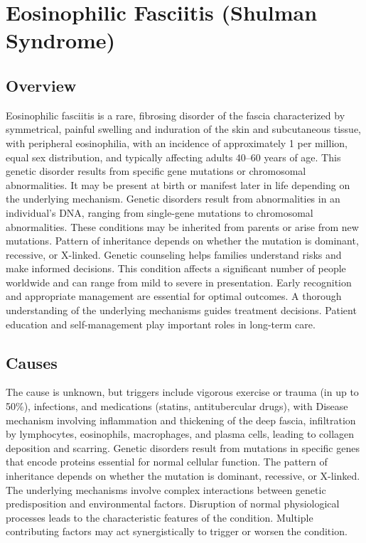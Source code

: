 \chapter{Eosinophilic Fasciitis (Shulman Syndrome)}
\label{sec:Eosinophilic Fasciitis (Shulman Syndrome)}

\section{Overview}
Eosinophilic fasciitis is a rare, fibrosing disorder of the fascia characterized by symmetrical, painful swelling and induration of the skin and subcutaneous tissue, with peripheral eosinophilia, with an incidence of approximately 1 per million, equal sex distribution, and typically affecting adults 40--60 years of age. This genetic disorder results from specific gene mutations or chromosomal abnormalities. It may be present at birth or manifest later in life depending on the underlying mechanism. Genetic disorders result from abnormalities in an individual's DNA, ranging from single-gene mutations to chromosomal abnormalities. These conditions may be inherited from parents or arise from new mutations. Pattern of inheritance depends on whether the mutation is dominant, recessive, or X-linked. Genetic counseling helps families understand risks and make informed decisions. This condition affects a significant number of people worldwide and can range from mild to severe in presentation. Early recognition and appropriate management are essential for optimal outcomes. A thorough understanding of the underlying mechanisms guides treatment decisions. Patient education and self-management play important roles in long-term care.
\section{Causes}
The cause is unknown, but triggers include vigorous exercise or trauma (in up to 50\%), infections, and medications (statins, antitubercular drugs), with Disease mechanism involving inflammation and thickening of the deep fascia, infiltration by lymphocytes, eosinophils, macrophages, and plasma cells, leading to collagen deposition and scarring. Genetic disorders result from mutations in specific genes that encode proteins essential for normal cellular function. The pattern of inheritance depends on whether the mutation is dominant, recessive, or X-linked. The underlying mechanisms involve complex interactions between genetic predisposition and environmental factors. Disruption of normal physiological processes leads to the characteristic features of the condition. Multiple contributing factors may act synergistically to trigger or worsen the condition.
